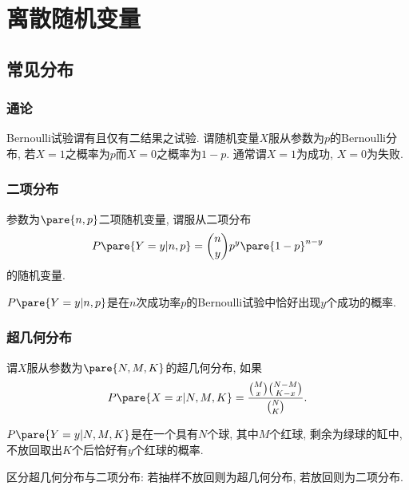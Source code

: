 \documentclass{ctexart}
\begin{document}
\section{离散随机变量} %
\label{sec:离散随机变量}

\subsection{常见分布} %
\label{sub:常见分布}

\subsubsection{通论} %
\label{ssub:通论}

\begin{definition}[Bernoulli试验]
    Bernoulli试验谓有且仅有二结果之试验. 谓随机变量$X$服从参数为$p$的Bernoulli分布,
    若$X=1$之概率为$p$而$X=0$之概率为$1-p$. 通常谓$X=1$为成功, $X=0$为失败.
\end{definition}


\subsubsection{二项分布} %
\label{ssub:二项分布}

\begin{definition}[二项随机变量与二项分布]
    参数为$\pare{n,p}$二项随机变量, 谓服从二项分布
    \[ P\pare{Y=y\vert n,p} = \binom{n}{y}p^y\pare{1-p}^{n-y} \]
    的随机变量.
\end{definition}
\begin{lemma}[二项随机分布的诠释]
    $P\pare{Y=y\vert n,p}$是在$n$次成功率$p$的Bernoulli试验中恰好出现$y$个成功的概率.
\end{lemma}


\subsubsection{超几何分布} %
\label{ssub:超几何分布}

\begin{definition}[超几何分布]
    谓$X$服从参数为$\pare{N,M,K}$的超几何分布, 如果
    \[ P\pare{X=x\vert N,M,K} = \frac{\binom{M}{x}\binom{N-M}{K-x}}{\binom{N}{K}}. \]
\end{definition}
\begin{lemma}[超几何分布的诠释]
    $P\pare{Y=y\vert N,M,K}$是在一个具有$N$个球, 其中$M$个红球, 剩余为绿球的缸中, 不放回取出$K$个后恰好有$y$个红球的概率.
\end{lemma}
\begin{pitfall}
    区分超几何分布与二项分布: 若抽样不放回则为超几何分布, 若放回则为二项分布.
\end{pitfall}
\end{document}
